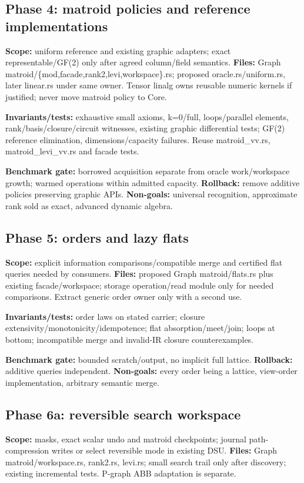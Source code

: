 \documentclass[10pt,a4paper]{article}
\begin{document}
\subsection{Phase 4: matroid policies and reference implementations}
\textbf{Scope:} uniform reference and existing graphic adapters; exact representable/GF(2) only after agreed column/field semantics. \textbf{Files:} Graph matroid/\{mod,facade,rank2,levi,workspace\}.rs; proposed oracle.rs/uniform.rs, later linear.rs under same owner. Tensor linalg owns reusable numeric kernels if justified; never move matroid policy to Core.

\textbf{Invariants/tests:} exhaustive small axioms, k=0/full, loops/parallel elements, rank/basis/closure/circuit witnesses, existing graphic differential tests; GF(2) reference elimination, dimensions/capacity failures. Reuse matroid\_vv.rs, matroid\_levi\_vv.rs and facade tests.

\textbf{Benchmark gate:} borrowed acquisition separate from oracle work/workspace growth; warmed operations within admitted capacity. \textbf{Rollback:} remove additive policies preserving graphic APIs. \textbf{Non-goals:} universal recognition, approximate rank sold as exact, advanced dynamic algebra.

\subsection{Phase 5: orders and lazy flats}
\textbf{Scope:} explicit information comparisons/compatible merge and certified flat queries needed by consumers. \textbf{Files:} proposed Graph matroid/flats.rs plus existing facade/workspace; storage operation/read module only for needed comparisons. Extract generic order owner only with a second use.

\textbf{Invariants/tests:} order laws on stated carrier; closure extensivity/monotonicity/idempotence; flat absorption/meet/join; loops at bottom; incompatible merge and invalid-IR closure counterexamples.

\textbf{Benchmark gate:} bounded scratch/output, no implicit full lattice. \textbf{Rollback:} additive queries independent. \textbf{Non-goals:} every order being a lattice, view-order implementation, arbitrary semantic merge.

\subsection{Phase 6a: reversible search workspace}
\textbf{Scope:} masks, exact scalar undo and matroid checkpoints; journal path-compression writes or select reversible mode in existing DSU. \textbf{Files:} Graph matroid/workspace.rs, rank2.rs, levi.rs; small search trail only after discovery; existing incremental tests. P-graph ABB adaptation is separate.
\end{document}
